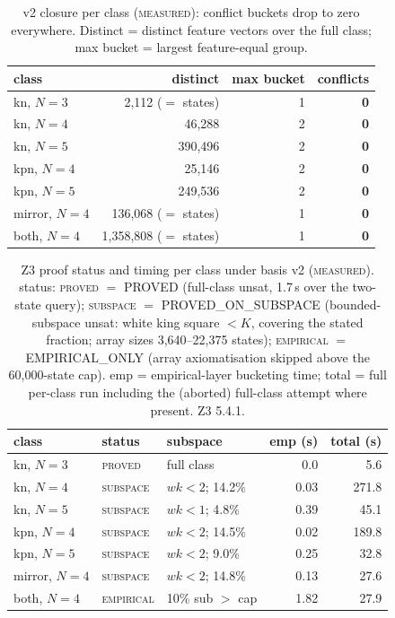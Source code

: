 \documentclass[conference]{IEEEtran}
\newcommand{\tierm}{\textsc{measured}}
\begin{document}
\begin{table}[t]
\caption{v2 closure per class (\tierm{}): conflict buckets drop to zero
everywhere. Distinct = distinct feature vectors over the full class;
max bucket = largest feature-equal group.}
\label{tab:v2}
\centering
\footnotesize
\begin{tabular}{lrrr}
\toprule
class & distinct & max bucket & conflicts \\
\midrule
kn, $N{=}3$ & 2{,}112 ($=$ states) & 1 & \textbf{0} \\
kn, $N{=}4$ & 46{,}288 & 2 & \textbf{0} \\
kn, $N{=}5$ & 390{,}496 & 2 & \textbf{0} \\
kpn, $N{=}4$ & 25{,}146 & 2 & \textbf{0} \\
kpn, $N{=}5$ & 249{,}536 & 2 & \textbf{0} \\
mirror, $N{=}4$ & 136{,}068 ($=$ states) & 1 & \textbf{0} \\
both, $N{=}4$ & 1{,}358{,}808 ($=$ states) & 1 & \textbf{0} \\
\bottomrule
\end{tabular}
\end{table}

\begin{table}[t]
\caption{Z3 proof status and timing per class under basis v2 (\tierm{}).
status: \textsc{proved} $=$ PROVED (full-class unsat, 1.7\,s over the
two-state query); \textsc{subspace}
$=$ PROVED\_ON\_SUBSPACE (bounded-subspace unsat: white king square $< K$,
covering the stated fraction; array sizes 3{,}640--22{,}375 states);
\textsc{empirical} $=$ EMPIRICAL\_ONLY (array axiomatisation
skipped above the 60{,}000-state cap). emp = empirical-layer bucketing
time; total = full per-class run including the (aborted) full-class
attempt where present. Z3 5.4.1.}
\label{tab:status}
\centering
\scriptsize
\setlength{\tabcolsep}{2.6pt}
\begin{tabular}{lllrr}
\toprule
class & status & subspace & emp (s) & total (s) \\
\midrule
kn, $N{=}3$ & \textsc{proved} & full class & 0.0 & 5.6 \\
kn, $N{=}4$ & \textsc{subspace} & $wk{<}2$; 14.2\% & 0.03 & 271.8 \\
kn, $N{=}5$ & \textsc{subspace} & $wk{<}1$; 4.8\% & 0.39 & 45.1 \\
kpn, $N{=}4$ & \textsc{subspace} & $wk{<}2$; 14.5\% & 0.02 & 189.8 \\
kpn, $N{=}5$ & \textsc{subspace} & $wk{<}2$; 9.0\% & 0.25 & 32.8 \\
mirror, $N{=}4$ & \textsc{subspace} & $wk{<}2$; 14.8\% & 0.13 & 27.6 \\
both, $N{=}4$ & \textsc{empirical} & 10\% sub $>$ cap & 1.82 & 27.9 \\
\bottomrule
\end{tabular}
\end{table}
\end{document}
